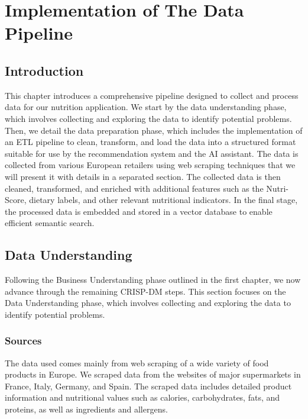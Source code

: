 \chapter{Implementation of The Data Pipeline}
\section*{Introduction}

This chapter introduces a comprehensive pipeline designed to collect
and process data for our nutrition application. We start by the data
understanding phase, which involves collecting and exploring the data
to identify potential problems. Then, we detail the data preparation
phase, which includes the implementation of an ETL pipeline to clean,
transform, and load the data into a structured format suitable for use by
the recommendation system and the AI assistant. The data is collected
from various European retailers using web scraping techniques that we
will present it with details in a separated section. The collected data is
then cleaned, transformed, and enriched with additional features such as
the Nutri-Score, dietary labels, and other relevant nutritional indicators.
In the final stage, the processed data is embedded and stored in a vector
database to enable efficient semantic search.
\section{Data Understanding}
Following the Business Understanding phase outlined in the first
chapter, we now advance through the remaining CRISP-DM steps.
This section focuses on the Data Understanding phase, which involves
collecting and exploring the data to identify potential problems.

\subsection{Sources}

\par The data used comes mainly from web scraping of a wide variety of
food products in Europe. We scraped data from the websites of major
supermarkets in France, Italy, Germany, and Spain.
The scraped data includes detailed product information and nutritional
values such as calories, carbohydrates, fats, and proteins, as well as
ingredients and allergens.

